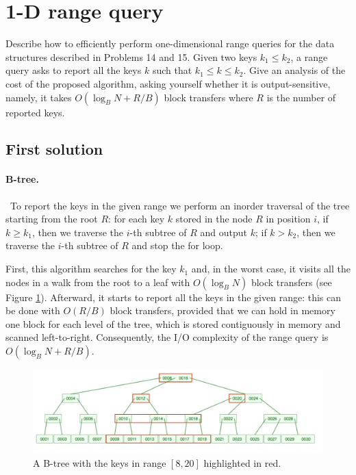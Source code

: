 \section{1-D range query}
Describe how to efficiently perform one-dimensional range queries for the data structures described in Problems 14 and 15. Given two keys $k_1 \leq k_2$, a range query asks to report all the keys $k$ such that $k_1 \leq k \leq k_2$. Give an analysis of the cost of the proposed algorithm, asking yourself whether it is output-sensitive, namely, it takes $O(\log_B N + R/B)$ block transfers where $R$ is the number of reported keys.

\subsection{First solution}

\paragraph{B-tree.} To report the keys in the given range we perform an inorder traversal of the tree starting from the root $R$: for each key $k$ stored in the node $R$ in position $i$, if $k \geq k_1$, then we traverse the $i$-th subtree of $R$ and output $k$; if $k > k_2$, then we traverse the $i$-th subtree of $R$ and stop the for loop.
\begin{center}
\end{center}

First, this algorithm searches for the key $k_1$ and, in the worst case, it visits all the nodes in a walk from the root to a leaf with $O(\log_B N)$ block transfers (see Figure \ref{figure:btree-range}). Afterward, it starts to report all the keys in the given range: this can be done with $O(R/B)$ block transfers, provided that we can hold in memory one block for each level of the tree, which is stored contiguously in memory and scanned left-to-right. Consequently, the I/O complexity of the range query is $O(\log_B N + R/B)$.
\begin{figure}[h]
  \includegraphics[width=\linewidth]{images/btree-range}
  \caption{A B-tree with the keys in range $[8, 20]$ highlighted in red.}
  \label{figure:btree-range}
\end{figure}


